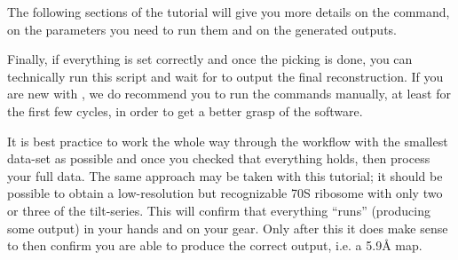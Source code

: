 The following sections of the tutorial will give you more details on the command, on the parameters you need to run them and on the generated outputs.

Finally, if everything is set correctly and once the picking is done, you can technically run this script and wait for {\emClarity} to output the final reconstruction. If you are new with {\emClarity}, we do recommend you to run the commands manually, at least for the first few cycles, in order to get a better grasp of the software.

\begin{tip}It is best practice to work the whole way through the workflow with the smallest data-set as possible and once you checked that everything holds, then process your full data. The same approach may be taken with this tutorial; it should be possible to obtain a low-resolution but recognizable 70S ribosome with only two or three of the tilt-series. This will confirm that everything ``runs'' (producing some output) in your hands and on your gear. Only after this it does make sense to then confirm you are able to produce the correct output, i.e. a 5.9\r{A} map.
\end{tip}
